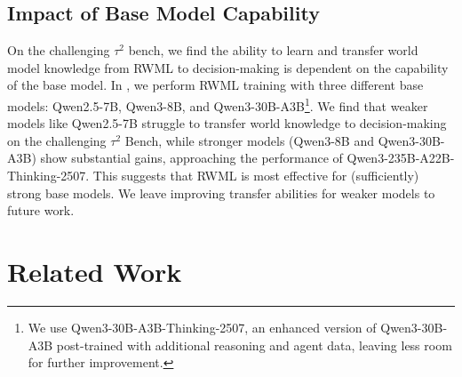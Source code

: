 \documentclass{article}
\theoremstyle{plain}
\theoremstyle{definition}
\theoremstyle{remark}
\newcommand{\shortmethod}[0]{RWML}
\newcommand{\wmrlshort}[0]{\shortmethod}
\begin{document}
\subsection{Impact of Base Model Capability}
\label{subsec:model_scale}
On the challenging $\tau^2$ bench, we find the ability to learn and transfer world model knowledge from \wmrlshort{} to decision-making is dependent on the capability of the base model.
In , we perform \wmrlshort{} training with three different base models: Qwen2.5-7B, Qwen3-8B, and Qwen3-30B-A3B\footnote{We use Qwen3-30B-A3B-Thinking-2507, an enhanced version of Qwen3-30B-A3B post-trained with additional reasoning and agent data, leaving less room for further improvement.}.
We find that weaker models like Qwen2.5-7B struggle to transfer world knowledge to decision-making on the challenging $\tau^2$ Bench, while stronger models (Qwen3-8B and Qwen3-30B-A3B) show substantial gains, approaching the performance of Qwen3-235B-A22B-Thinking-2507.
This suggests that \wmrlshort{} is most effective for (sufficiently) strong base models. We leave improving transfer abilities for weaker models to future work.



\section{Related Work}
\label{sec:related_work}


\end{document}
